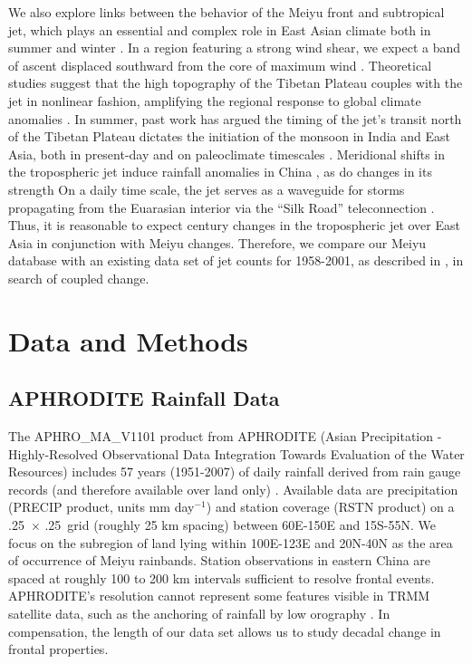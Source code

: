\documentclass[draft,grl]{AGUTeX}
\begin{document}
\begin{article}
	We also explore links between the behavior of the Meiyu front and subtropical jet, which plays an essential and complex role in East Asian climate both in summer and winter \citep{Yang2002}. In a region featuring a strong wind shear, we expect a band of ascent displaced southward from the core of maximum wind \citep{Holton2004}. Theoretical studies suggest that the high topography of the Tibetan Plateau couples with the jet in nonlinear fashion, amplifying the regional response to global climate anomalies \citep{Nigam1989,Broccoli1992,Park1997}. In summer, past work has argued the timing of the jet's transit north of the Tibetan Plateau dictates the initiation of the monsoon in India and East Asia, both in present-day \citep{Yin1949,Hahn1975,Yeh1959} and on paleoclimate timescales \citep{Nagashima2011,Nagashima2013,Chiang2015}. Meridional shifts in the tropospheric jet induce rainfall anomalies in China \citep{Liang1998}, as do changes in its strength \citep{Kwon2007,Du2009,Li2014} On a daily time scale, the jet serves as a waveguide for storms propagating from the Euarasian interior via the ``Silk Road'' teleconnection \citep{Hoskins1993,Ambrizzi1997,Kosaka2012}. Thus, it is reasonable to expect  century changes in the tropospheric jet over East Asia in conjunction with Meiyu changes. Therefore, we compare our Meiyu database with an existing data set of jet counts for 1958-2001, as described in \citet{Schiemann2009}, in search of coupled change.
	
\section{Data and Methods}

\subsection{APHRODITE Rainfall Data}

	The APHRO\_MA\_V1101 product from APHRODITE (Asian Precipitation - Highly-Resolved Observational Data Integration Towards Evaluation of the Water Resources) includes 57 years (1951-2007) of daily  rainfall derived from rain gauge records (and therefore available over land only) \citep{Yatagai2012} . Available data are precipitation (PRECIP product, units mm day$^{-1}$) and station coverage (RSTN product) on a .25\textdegree\ $\times$ .25\textdegree\ grid (roughly 25 km spacing) between 60\textdegree E-150\textdegree E and 15\textdegree S-55\textdegree N. We focus on the subregion of land lying within 100\textdegree E-123\textdegree E and 20\textdegree N-40\textdegree N as the area of occurrence of Meiyu rainbands. Station observations in eastern China are spaced at roughly 100 to 200 km intervals sufficient to resolve frontal events. APHRODITE's resolution cannot represent some features visible in TRMM satellite data, such as the anchoring of rainfall by low orography \citep{Xu2009}. In compensation, the length of our data set allows us to study decadal change in frontal properties. 
	

\end{article}
\end{document}
